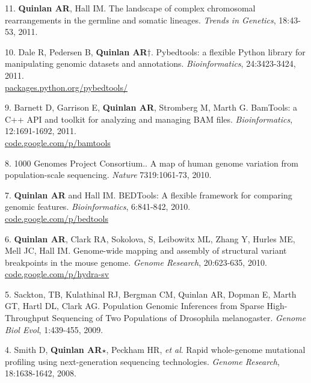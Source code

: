 \documentclass[margin,line]{cv}
\begin{document}
\begin{resume}
\begin{list}{*}{}
    \item[11.] \textbf{Quinlan AR}, Hall IM. 
    The landscape of complex chromosomal rearrangements in the germline and somatic lineages. 
    \textit{Trends in Genetics}, 18:43-53, 2011.
    
    \item[10.] Dale R, Pedersen B, \textbf{Quinlan AR}$\dagger$. 
    Pybedtools: a flexible Python library for manipulating genomic datasets and annotations. 
    \textit{Bioinformatics}, 24:3423-3424, 2011.\\
    \url{packages.python.org/pybedtools/}
    
    \item[9.] Barnett D, Garrison E, \textbf{Quinlan AR}, Stromberg M, Marth G.
    BamTools: a C++ API and toolkit for analyzing and managing BAM files.
    \textit{Bioinformatics}, 12:1691-1692, 2011.\\
    \url{code.google.com/p/bamtools}

    \item[8.] 1000 Genomes Project Consortium.. 
    A map of human genome variation from population-scale sequencing. 
    \textit{Nature} 7319:1061-73, 2010.

    \item[7.] \textbf{Quinlan AR} and Hall IM.
    BEDTools: A flexible framework for comparing genomic features. 
    \textit{Bioinformatics}, 6:841-842, 2010.\\
    \url{code.google.com/p/bedtools}

    \item[6.] \textbf{Quinlan AR}, Clark RA, Sokolova, S, Leibowitx ML, Zhang Y, Hurles ME, Mell JC, Hall IM. 
    Genome-wide mapping and assembly of structural variant breakpoints in the mouse genome. 
    \textit{Genome Research}, 20:623-635, 2010.\\
    \url{code.google.com/p/hydra-sv}

    \item[5.] Sackton, TB, Kulathinal RJ, Bergman CM, Quinlan AR, Dopman E, Marth GT, Hartl DL, Clark AG. 
    Population Genomic Inferences from Sparse High-Throughput Sequencing of Two Populations of Drosophila melanogaster. 
    \textit{Genome Biol Evol}, 1:439-455, 2009.

    \item[4.] Smith D, \textbf{Quinlan AR}$\star$, Peckham HR, \textit{et al}. 
    Rapid whole-genome mutational profiling using next-generation sequencing technologies. 
    \textit{Genome Research}, 18:1638-1642, 2008.


\end{list}
\end{resume}
\end{document}

